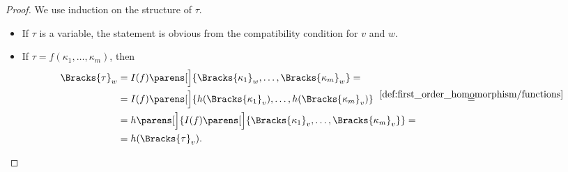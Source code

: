 \begin{proof}
   We use induction on the structure of \( \tau \).
  \begin{itemize}
    \item If \( \tau \) is a variable, the statement is obvious from the compatibility condition for \( v \) and \( w \).
    \item If \( \tau = f(\kappa_1, \ldots, \kappa_m) \), then
    \begin{align*}
      \Bracks{\tau}_w
      &=
      I(f) \parens[\Big]{ \Bracks{\kappa_1}_w, \ldots, \Bracks{\kappa_m}_w }
      = \\ &=
      I(f) \parens[\Big]{ h(\Bracks{\kappa_1}_v), \ldots, h(\Bracks{\kappa_m}_v) }
      \reloset {\ref{def:first_order_homomorphism/functions}} = \\ &=
      h\parens[\Big]{ I(f) \parens[\Big]{ \Bracks{\kappa_1}_v, \ldots, \Bracks{\kappa_m}_v } }
      = \\ &=
      h(\Bracks{\tau}_v).
    \end{align*}
  \end{itemize}
\end{proof}

